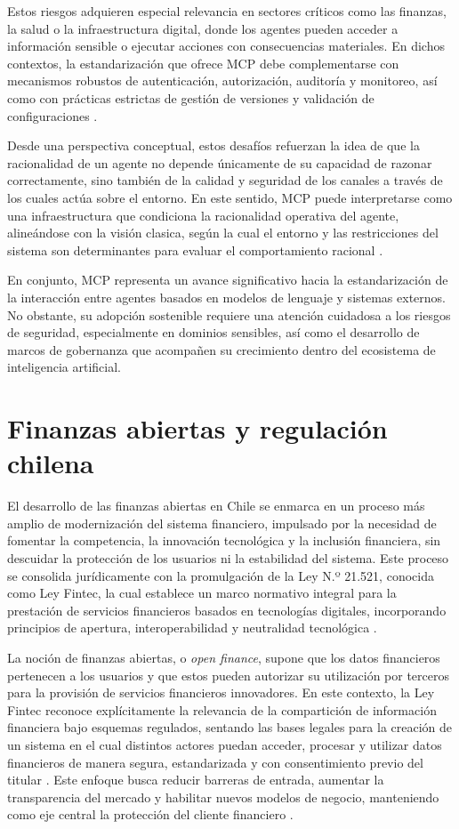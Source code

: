 \documentclass[
	spanish, %
	letterpaper, oneside
]{book}
\begin{document}
Estos riesgos adquieren especial relevancia en sectores críticos como las finanzas, la salud o la infraestructura digital, donde los agentes pueden acceder a información sensible o ejecutar acciones con consecuencias materiales. En dichos contextos, la estandarización que ofrece MCP debe complementarse con mecanismos robustos de autenticación, autorización, auditoría y monitoreo, así como con prácticas estrictas de gestión de versiones y validación de configuraciones \cite{hou2025mcp}.

Desde una perspectiva conceptual, estos desafíos refuerzan la idea de que la racionalidad de un agente no depende únicamente de su capacidad de razonar correctamente, sino también de la calidad y seguridad de los canales a través de los cuales actúa sobre el entorno. En este sentido, MCP puede interpretarse como una infraestructura que condiciona la racionalidad operativa del agente, alineándose con la visión clasica, según la cual el entorno y las restricciones del sistema son determinantes para evaluar el comportamiento racional \cite{russell2010aima}.

En conjunto, MCP representa un avance significativo hacia la estandarización de la interacción entre agentes basados en modelos de lenguaje y sistemas externos. No obstante, su adopción sostenible requiere una atención cuidadosa a los riesgos de seguridad, especialmente en dominios sensibles, así como el desarrollo de marcos de gobernanza que acompañen su crecimiento dentro del ecosistema de inteligencia artificial.


\section{Finanzas abiertas y regulación chilena}

El desarrollo de las finanzas abiertas en Chile se enmarca en un proceso más amplio de modernización del sistema financiero, impulsado por la necesidad de fomentar la competencia, la innovación tecnológica y la inclusión financiera, sin descuidar la protección de los usuarios ni la estabilidad del sistema. Este proceso se consolida jurídicamente con la promulgación de la Ley N.º 21.521, conocida como Ley Fintec, la cual establece un marco normativo integral para la prestación de servicios financieros basados en tecnologías digitales, incorporando principios de apertura, interoperabilidad y neutralidad tecnológica \cite{ley21521,cmf_fintech}.

La noción de finanzas abiertas, o \emph{open finance}, supone que los datos financieros pertenecen a los usuarios y que estos pueden autorizar su utilización por terceros para la provisión de servicios financieros innovadores. En este contexto, la Ley Fintec reconoce explícitamente la relevancia de la compartición de información financiera bajo esquemas regulados, sentando las bases legales para la creación de un sistema en el cual distintos actores puedan acceder, procesar y utilizar datos financieros de manera segura, estandarizada y con consentimiento previo del titular \cite{ley21521}. Este enfoque busca reducir barreras de entrada, aumentar la transparencia del mercado y habilitar nuevos modelos de negocio, manteniendo como eje central la protección del cliente financiero \cite{cmf_fintech}.
\end{document}
